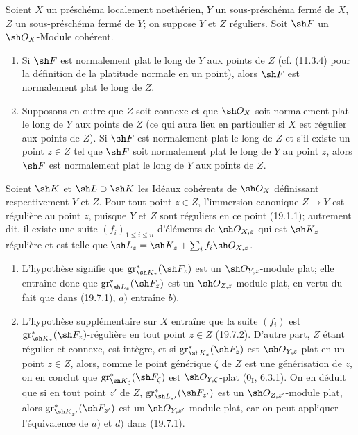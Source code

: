 \begin{corollary}[19.7.5]
\label{IV.19.7.5}
Soient $X$ un préschéma localement noethérien, $Y$ un sous-préschéma fermé de $X$, $Z$ un sous-préschéma fermé de $Y$; on suppose $Y$ et $Z$ réguliers. Soit $\sh F$ un $\sh O_X$-Module cohérent.
\begin{enumerate}
  \item[(i)] Si $\sh F$ est normalement plat le long de $Y$ aux points de $Z$ (cf. (11.3.4) pour la définition de la platitude normale en un point), alors $\sh F$ est normalement plat le long de $Z$.
  \item[(ii)] Supposons en outre que $Z$ soit connexe et que $\sh O_X$ soit normalement plat le long de $Y$ aux points de $Z$ (ce qui aura lieu en particulier si $X$ est régulier aux points de $Z$). Si $\sh F$ est normalement plat le long de $Z$ et s'il existe un point $z\in Z$ tel que $\sh F$ soit normalement plat le long de $Y$ au point $z$, alors $\sh F$ est normalement plat le long de $Y$ aux points de $Z$.
\end{enumerate}

Soient $\sh K$ et $\sh L\supset\sh K$ les Idéaux cohérents de $\sh O_X$ définissant respectivement $Y$ et $Z$. Pour tout point $z\in Z$, l'immersion canonique $Z\to Y$ est régulière au point $z$, puisque $Y$ et $Z$ sont réguliers en ce point (19.1.1); autrement dit, il existe une suite $(f_i)_{1\leq i\leq n}$ d'éléments de $\sh O_{X,z}$ qui est $\sh K_z$-régulière et est telle que $\sh L_z=\sh K_z+\sum_i f_i\sh O_{X,z}$.
\begin{enumerate}
  \item[(i)] L'hypothèse signifie que $\operatorname{gr}_{\sh K_z}^*(\sh F_z)$ est un $\sh O_{Y,z}$-module plat; elle entraîne donc que $\operatorname{gr}_{\sh L_z}^*(\sh F_z)$ est un $\sh O_{Z,z}$-module plat, en vertu du fait que dans (19.7.1), $a)$ entraîne $b)$.
  \item[(ii)] L'hypothèse supplémentaire sur $X$ entraîne que la suite $(f_i)$ est $\operatorname{gr}_{\sh K_z}^*(\sh F_z)$-régulière en tout point $z\in Z$ (19.7.2). D'autre part, $Z$ étant régulier et connexe, est intègre, et si $\operatorname{gr}_{\sh K_z}^*(\sh F_z)$ est $\sh O_{Y,z}$-plat en un point $z\in Z$, alors, comme le point générique $\zeta$ de $Z$ est une générisation de $z$, on en conclut que $\operatorname{gr}_{\sh K_\zeta}^*(\sh F_\zeta)$ est $\sh O_{Y,\zeta}$-plat ($0_{\mathrm I}$, 6.3.1). On en déduit que si en tout point $z'$ de $Z$, $\operatorname{gr}_{\sh L_{z'}}^*(\sh F_{z'})$ est un $\sh O_{Z,z'}$-module plat, alors $\operatorname{gr}_{\sh K_{z'}}^*(\sh F_{z'})$ est un $\sh O_{Y,z'}$-module plat, car on peut appliquer l'équivalence de $a)$ et $d)$ dans (19.7.1).
\end{enumerate}
\end{corollary}

